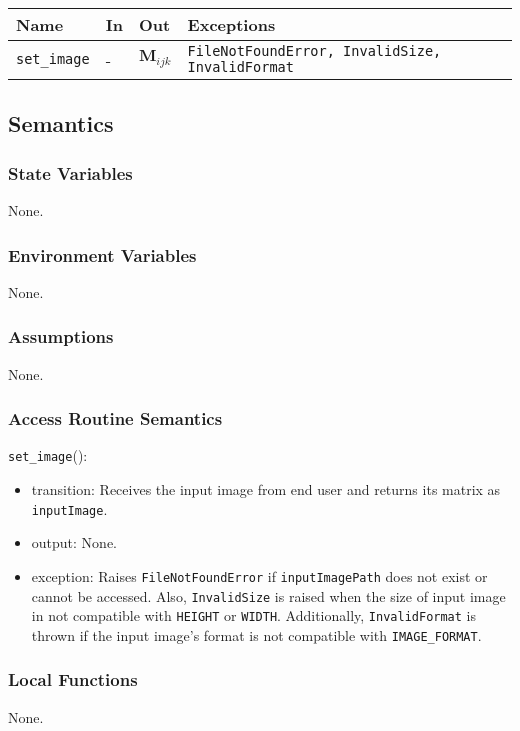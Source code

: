 \documentclass[12pt, titlepage]{article}
\def\code#1{\texttt{#1}}
\begin{document}
\begin{center}
\begin{tabular}{p{3.5cm} p{4cm} p{4cm} p{4cm}}
\hline
\textbf{Name} & \textbf{In} & \textbf{Out} & \textbf{Exceptions} \\
\hline
\code{set\_image} & - & $\mathbf{M}_{ijk}$ & \code{FileNotFoundError, InvalidSize, InvalidFormat} \\
\hline
\end{tabular}
\end{center}

\subsection{Semantics}

\subsubsection{State Variables}
None.

\subsubsection{Environment Variables}
None.

\subsubsection{Assumptions}
None.

\subsubsection{Access Routine Semantics}

\noindent \code{set\_image}():
\begin{itemize}
  \item transition: Receives the input image from end user and returns its matrix as \code{inputImage}.
  \item output: None.
  \item exception: Raises \code{FileNotFoundError} if \code{inputImagePath} does not exist or cannot be accessed. 
  Also, \code{InvalidSize} is raised when the size of input image in not compatible with \code{HEIGHT} or 
  \code{WIDTH}. Additionally, \code{InvalidFormat} is thrown if the input image's format is 
  not compatible with \code{IMAGE\_FORMAT}.
\end{itemize}

\subsubsection{Local Functions}
None.
\end{document}
